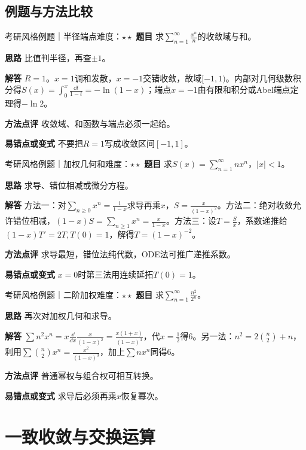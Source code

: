 \subsection{例题与方法比较}
\begin{example}{考研风格例题｜半径端点}{难度：$\star\star$}
\label{ex:9:7}\textbf{题目} 求$\sum_{n=1}^{\infty}\frac{x^n}{n}$的收敛域与和。\par
\textbf{思路} 比值判半径，再查$\pm1$。\par
\textbf{解答} $R=1$。$x=1$调和发散，$x=-1$交错收敛，故域$[-1,1)$。内部对几何级数积分得$S(x)=\int_0^x\frac{\dd t}{1-t}=-\ln(1-x)$；端点$x=-1$由有限和积分或Abel端点定理得$-\ln2$。\par
\textbf{方法点评} 收敛域、和函数与端点必须一起给。\par
\textbf{易错点或变式} 不要把$R=1$写成收敛区间$[-1,1]$。
\end{example}
\begin{example}{考研风格例题｜加权几何和}{难度：$\star\star$}
\label{ex:9:8}\textbf{题目} 求$S(x)=\sum_{n=1}^{\infty}nx^n$，$|x|<1$。\par
\textbf{思路} 求导、错位相减或微分方程。\par
\textbf{解答} 方法一：对$\sum_{n\ge0}x^n=\frac{1}{1-x}$求导再乘$x$，$S=\frac{x}{(1-x)^2}$。方法二：绝对收敛允许错位相减，$(1-x)S=\sum_{n\ge1}x^n=\frac{x}{1-x}$。方法三：设$T=\frac{S}{x}$，系数递推给$(1-x)T\prime=2T,T(0)=1$，解得$T=(1-x)^{-2}$。\par
\textbf{方法点评} 求导最短，错位法纯代数，ODE法可推广递推系数。\par
\textbf{易错点或变式} $x=0$时第三法用连续延拓$T(0)=1$。
\end{example}
\begin{example}{考研风格例题｜二阶加权}{难度：$\star\star$}
\label{ex:9:9}\textbf{题目} 求$\sum_{n=1}^{\infty}\frac{n^2}{2^n}$。\par
\textbf{思路} 再次对加权几何和求导。\par
\textbf{解答} $\sum n^2x^n=x\frac\dd{\dd x}\frac{x}{(1-x)^2}=\frac{x(1+x)}{(1-x)^3}$，代$x=\frac{1}{2}$得6。另一法：$n^2=2\binom n2+n$，利用$\sum\binom n2x^n=\frac{x^2}{(1-x)^3}$，加上$\sum nx^n$同得6。\par
\textbf{方法点评} 普通幂权与组合权可相互转换。\par
\textbf{易错点或变式} 求导后必须再乘$x$恢复幂次。
\end{example}
\section{一致收敛与交换运算}\label{sec:9:4}

